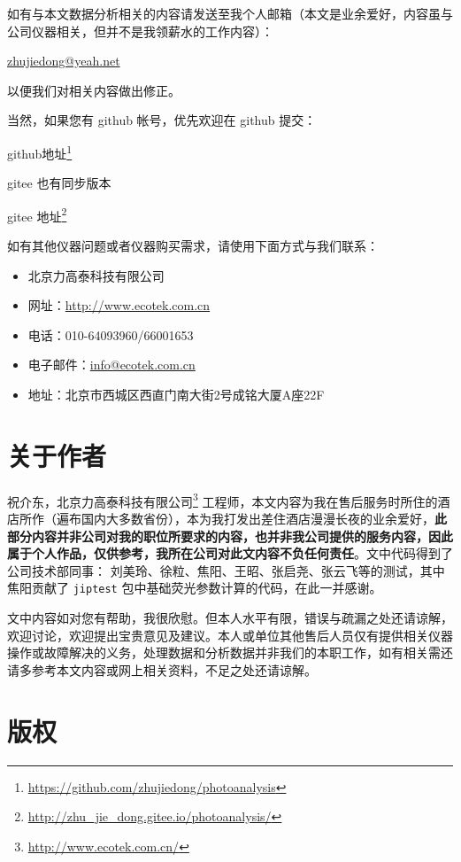 \documentclass[
]{krantz}
\renewcommand{\href}[2]{#2\footnote{\url{#1}}}
\begin{document}
如有与本文数据分析相关的内容请发送至我个人邮箱（本文是业余爱好，内容虽与公司仪器相关，但并不是我领薪水的工作内容）：

\url{zhujiedong@yeah.net}

以便我们对相关内容做出修正。

当然，如果您有 github 帐号，优先欢迎在 github 提交：

\href{https://github.com/zhujiedong/photoanalysis}{github地址}

gitee 也有同步版本

\href{http://zhu_jie_dong.gitee.io/photoanalysis/}{gitee 地址}

如有其他仪器问题或者仪器购买需求，请使用下面方式与我们联系：

\begin{itemize}
\item
  北京力高泰科技有限公司
\item
  网址：\url{http://www.ecotek.com.cn}
\item
  电话：010-64093960/66001653
\item
  电子邮件：\url{info@ecotek.com.cn}
\item
  地址：北京市西城区西直门南大街2号成铭大厦A座22F
\end{itemize}

\hypertarget{author}{%
\chapter*{关于作者}\label{author}}


祝介东，\href{http://www.ecotek.com.cn/}{北京力高泰科技有限公司} 工程师，本文内容为我在售后服务时所住的酒店所作（遍布国内大多数省份），本为我打发出差住酒店漫漫长夜的业余爱好，\textbf{此部分内容并非公司对我的职位所要求的内容，也并非我公司提供的服务内容，因此属于个人作品，仅供参考，我所在公司对此文内容不负任何责任}。文中代码得到了公司技术部同事： 刘美玲、徐粒、焦阳、王昭、张启尧、张云飞等的测试，其中焦阳贡献了 \texttt{jiptest} 包中基础荧光参数计算的代码，在此一并感谢。

文中内容如对您有帮助，我很欣慰。但本人水平有限，错误与疏漏之处还请谅解，欢迎讨论，欢迎提出宝贵意见及建议。本人或单位其他售后人员仅有提供相关仪器操作或故障解决的义务，处理数据和分析数据并非我们的本职工作，如有相关需还请多参考本文内容或网上相关资料，不足之处还请谅解。

\hypertarget{copyright}{%
\chapter*{版权}\label{copyright}}
\end{document}
